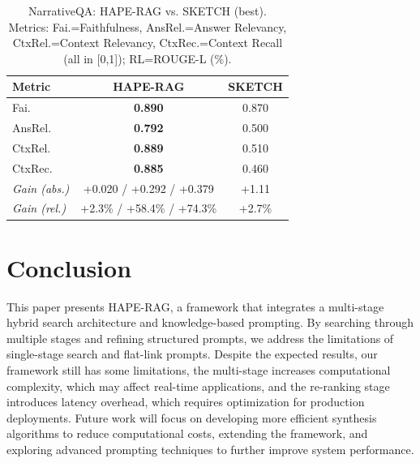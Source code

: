 \documentclass[10pt,twocolumn,letterpaper]{article}
\begin{document}
\begin{table}[t]
\small
\centering
\caption{NarrativeQA: HAPE-RAG vs. SKETCH (best). Metrics: Fai.=Faithfulness, AnsRel.=Answer Relevancy, CtxRel.=Context Relevancy, CtxRec.=Context Recall (all in [0,1]); RL=ROUGE-L (\%).}
\label{tab:narr_sketch_cmp}
\setlength{\tabcolsep}{6pt}
\begin{tabular}{lcc}
\toprule
\textbf{Metric} & \textbf{HAPE-RAG} & \textbf{SKETCH} \\
\midrule
Fai.      & \textbf{0.890} & 0.870 \\
AnsRel.   & \textbf{0.792} & 0.500 \\
CtxRel.   & \textbf{0.889} & 0.510 \\
CtxRec.   & \textbf{0.885} & 0.460 \\
\midrule
\textit{Gain (abs.)}  & +0.020 / +0.292 / +0.379  & +1.11 \\
\textit{Gain (rel.)}  & +2.3\% / +58.4\% / +74.3\% & +2.7\% \\
\bottomrule
\end{tabular}
\end{table}

\section{Conclusion}

This paper presents HAPE-RAG, a framework that integrates a multi-stage hybrid search architecture and knowledge-based prompting. By searching through multiple stages and refining structured prompts, we address the limitations of single-stage search and flat-link prompts. Despite the expected results, our framework still has some limitations, the multi-stage increases computational complexity, which may affect real-time applications, and the re-ranking stage introduces latency overhead, which requires optimization for production deployments.
Future work will focus on developing more efficient synthesis algorithms to reduce computational costs, extending the framework, and exploring advanced prompting techniques to further improve system performance.

{\small


}
\end{document}

